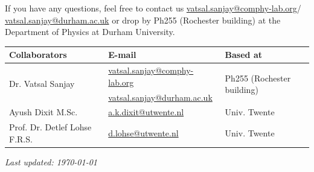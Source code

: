 \documentclass[11pt]{article}
\begin{document}
If you have any questions, feel free to contact us \href{mailto:vatsal.sanjay@comphy-lab.org}{vatsal.sanjay@comphy-lab.org}/\\\href{mailto:vatsal.sanjay@durham.ac.uk}{vatsal.sanjay@durham.ac.uk} or drop by Ph255 (Rochester building) at the Department of Physics at Durham University.

\begin{center}
\begin{tabular}{|l|l|l|}
\hline \textbf{Collaborators} & \textbf{E-mail} & \textbf{Based at} \\
\hline \multirow{2}{*}{Dr. Vatsal Sanjay} & \href{mailto:vatsal.sanjay@comphy-lab.org}{vatsal.sanjay@comphy-lab.org} & \multirow{2}{*}{Ph255 (Rochester building)} \\
& \href{mailto:vatsal.sanjay@durham.ac.uk}{vatsal.sanjay@durham.ac.uk} & \\
\hline Ayush Dixit M.Sc. & \href{mailto:a.k.dixit@utwente.nl}{a.k.dixit@utwente.nl} & Univ. Twente \\
\hline Prof. Dr. Detlef Lohse F.R.S. & \href{mailto:d.lohse@utwente.nl}{d.lohse@utwente.nl} & Univ. Twente  \\
\hline
\end{tabular}
\end{center}

\vspace{1em}
\noindent\textit{Last updated: \today}

\printbibliography
\end{document}
